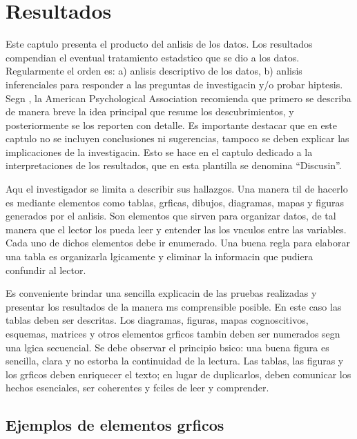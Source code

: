 \fancyhead{}
\fancyfoot{}
\cfoot{\thepage}


\chapter{Resultados}

Este captulo presenta el producto del anlisis de los datos. Los resultados compendian el eventual tratamiento estadstico que se dio a los datos. Regularmente el orden es: a) anlisis descriptivo de los datos, b) anlisis inferenciales para responder a las preguntas de investigacin y/o probar hiptesis. Segn \cite{sampieri}, la American Psychological Association recomienda que primero se describa de manera breve la idea principal que resume los descubrimientos, y posteriormente se los reporten con detalle. Es importante destacar que en este captulo no se incluyen conclusiones ni sugerencias, tampoco se deben explicar las implicaciones de la investigacin. Esto se hace en el captulo dedicado a la interpretaciones de los resultados, que en esta plantilla se denomina ``Discusin''.

Aqu el investigador se limita a describir sus hallazgos. Una manera til de hacerlo es mediante elementos como tablas, grficas, dibujos, diagramas, mapas y figuras generados por el anlisis. Son elementos que sirven para organizar datos, de tal manera que el lector los pueda leer y entender las los vnculos entre las variables. Cada uno de dichos elementos debe ir enumerado. Una buena regla para elaborar una tabla es organizarla lgicamente y eliminar la informacin que pudiera confundir al lector.

Es conveniente brindar una sencilla explicacin de las pruebas realizadas y presentar los resultados de la manera ms comprensible posible. En este caso las tablas deben ser descritas. Los diagramas, figuras, mapas cognoscitivos, esquemas, matrices y otros elementos grficos tambin deben ser numerados segn una  lgica secuencial. Se debe observar el principio bsico: una buena figura es sencilla, clara y no estorba la continuidad de la lectura. Las tablas, las figuras y los grficos deben enriquecer el texto; en lugar de duplicarlos, deben comunicar los hechos esenciales, ser coherentes y fciles de leer y comprender. 

\section{Ejemplos de elementos grficos}

